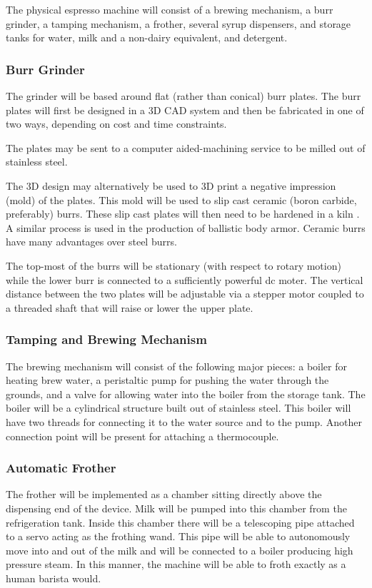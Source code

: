 \documentclass[conference]{IEEEtran}
\begin{document}
The physical espresso machine will consist of a brewing mechanism, a
burr grinder, a tamping mechanism, a frother, several syrup dispensers, and
storage tanks for water, milk and a non-dairy equivalent, and detergent.

\subsubsection{Burr Grinder}
The grinder will be based around flat (rather than conical) burr plates. The
burr plates will first be designed in a 3D CAD system and then be
fabricated in one of two ways, depending on cost and time constraints.

The plates may be sent to a computer aided-machining service to be milled out of
stainless steel. 

The 3D design may alternatively be used to 3D print a negative impression (mold) of the plates.
This mold will be used to slip cast
ceramic (boron carbide, preferably) burrs. These slip cast plates will then need
to be hardened in a kiln \cite{slip}. A similar process is used in the
production of ballistic body armor. Ceramic burrs have many advantages over steel burrs.

The top-most of the burrs will be stationary (with respect to rotary motion)
while the lower burr is connected to a sufficiently powerful dc moter. The
vertical distance between the two plates will be adjustable via a stepper motor coupled
to a threaded shaft that will raise or lower the upper plate.

\subsubsection{Tamping and Brewing Mechanism}
The brewing mechanism will consist of the following major pieces: a boiler for
heating brew water, a peristaltic pump for pushing the water through the
grounds, and a valve for allowing water into the boiler from the storage tank.
The boiler will be a cylindrical structure built out of stainless steel. This
boiler will have two threads for connecting it to the water source and to the
pump. Another connection point will be present for attaching a thermocouple.

\subsubsection{Automatic Frother}
The frother will be implemented as a chamber sitting directly above the
dispensing end of the device. Milk will be pumped into this chamber from the
refrigeration tank. Inside this chamber there will be a telescoping pipe
attached to a servo acting as the frothing wand. This pipe will be able to
autonomously move into and out of the milk and will be connected to a boiler
producing high pressure steam. In this manner, the machine will be able to froth
exactly as a human barista would.
\end{document}
